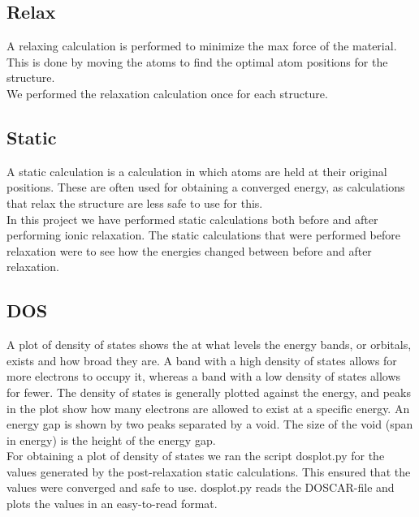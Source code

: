 \documentclass{article}
\begin{document}
  \subsection{Relax}

    A relaxing calculation is performed to minimize the max force of the material. This is done by moving the atoms to find the optimal atom positions for the structure. \\

    We performed the relaxation calculation once for each structure. \\


  \subsection{Static}

    A static calculation is a calculation in which atoms are held at their original positions. These are often used for obtaining a converged energy, as calculations that relax the structure are less safe to use for this.\\

    In this project we have performed static calculations both before and after performing ionic relaxation. The static calculations that were performed before relaxation were to see how the energies changed between before and after relaxation. \\


  \subsection{DOS}

    A plot of density of states shows the at what levels the energy bands, or orbitals, exists and how broad they are. A band with a high density of states allows for more electrons to occupy it, whereas a band with a low density of states allows for fewer. The density of states is generally plotted against the energy, and peaks in the plot show how many electrons are allowed to exist at a specific energy. An energy gap is shown by two peaks separated by a void. The size of the void (span in energy) is the height of the energy gap. \\

    For obtaining a plot of density of states we ran the script dosplot.py for the values generated by the post-relaxation static calculations. This ensured that the values were converged and safe to use. dosplot.py reads the DOSCAR-file and plots the values in an easy-to-read format. \\
\end{document}
